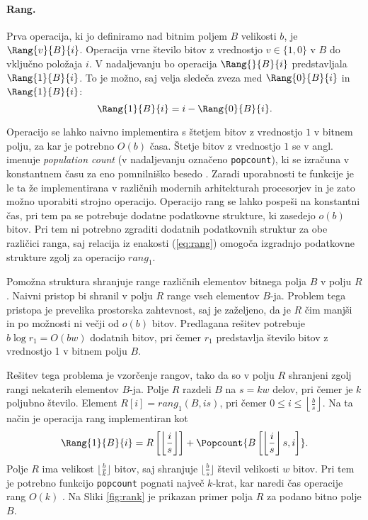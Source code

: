 \paragraph{Rang.} 
Prva operacija, ki jo definiramo nad bitnim poljem $B$ velikosti $b$, je $\Rang{v}{B}{i}$. Operacija vrne število bitov z vrednostjo $v\in\{1,0\}$ v $B$ do vključno položaja $i$. V nadaljevanju bo operacija $\Rang{}{B}{i}$ predstavljala $\Rang{1}{B}{i}$. To je možno, saj velja sledeča zveza med $\Rang{0}{B}{i}$ in $\Rang{1}{B}{i}$:
\begin{equation}\label{eq:rang}
    \Rang{1}{B}{i}=i-\Rang{0}{B}{i}.
\end{equation}

Operacijo se lahko naivno implementira s štetjem bitov z vrednostjo $1$ v bitnem polju, za kar je potrebno $O(b)$ časa. Štetje bitov z vrednostjo $1$ se v angl. imenuje \textit{population count} (v nadaljevanju označeno \texttt{popcount}), ki se izračuna v konstantnem času za eno pomnilniško besedo \cite{Brodnik1995,Knuth2011}. Zaradi uporabnosti te funkcije je le ta že implementirana v različnih modernih arhitekturah procesorjev in je zato možno uporabiti strojno operacijo. Operacijo rang se lahko pospeši na konstantni čas, pri tem pa se potrebuje dodatne podatkovne strukture, ki zasedejo $o(b)$ bitov. Pri tem ni potrebno zgraditi dodatnih podatkovnih struktur za obe različici ranga, saj relacija iz enakosti (\ref{eq:rang}) omogoča izgradnjo podatkovne strukture zgolj za operacijo $rang_1$.

Pomožna struktura shranjuje range različnih elementov bitnega polja $B$ v polju $R$. Naivni pristop bi shranil v polju $R$ range vseh elementov $B$-ja. Problem tega pristopa je prevelika prostorska zahtevnost, saj je zaželjeno, da je $R$ čim manjši in po možnosti ni večji od $o(b)$ bitov. Predlagana rešitev potrebuje $b\log{r_1}=O(bw)$ dodatnih bitov, pri čemer $r_1$ predstavlja število bitov z vrednostjo 1 v bitnem polju $B$.

Rešitev tega problema je vzorčenje rangov, tako da so v polju $R$ shranjeni zgolj rangi nekaterih elementov $B$-ja. Polje $R$ razdeli $B$ na $s=kw$ delov, pri čemer je $k$ poljubno število. Element $R[i]=rang_1(B,is)$, pri čemer $0\le i \le \left\lfloor\frac{b}{s} \right\rfloor$. Na ta način je operacija rang implementiran kot 
\begin{equation*}
    \Rang{1}{B}{i}=R\left[\left\lfloor\frac{i}{s} \right\rfloor\right] + \Popcount{B\left[\left\lfloor\frac{i}{s} \right\rfloor s,i\right]}.
\end{equation*}
Polje $R$ ima velikost $\lfloor\frac{b}{k}\rfloor$ bitov, saj shranjuje $\lfloor\frac{b}{s}\rfloor$ števil velikosti $w$ bitov. Pri tem je potrebno funkcijo \texttt{popcount} pognati največ $k$-krat, kar naredi čas operacije rang $O(k)$ \cite{Navarro2016}. Na Sliki \ref{fig:rank} je prikazan primer polja $R$ za podano bitno polje $B$.

